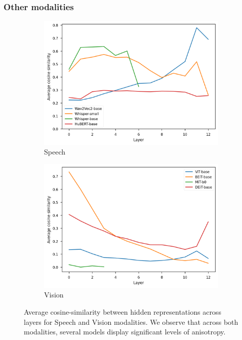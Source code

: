 \subsubsection{Other modalities}
\label{sec:other_mod}
\begin{figure}[ht]
    \centering
    \begin{subfigure}[b]{0.43\textwidth}
         \includegraphics[width=\linewidth]{sources/part_1/anisotropy/imgs/cosine_audio.png}
         \caption{Speech}
         \label{fig:cos_speech}
    \end{subfigure}
    \hfill
    \begin{subfigure}[b]{0.43\textwidth}
         \includegraphics[width=\linewidth]{sources/part_1/anisotropy/imgs/cosine_vit_imagenet.png}
         \caption{Vision}
         \label{fig:cos_audio}
    \end{subfigure}
    \caption{Average cosine-similarity between hidden representations across layers for Speech and Vision modalities. We observe that across both modalities, several models display significant levels of anisotropy.}
    \label{fig:anisotropy_modalities}
\end{figure}

